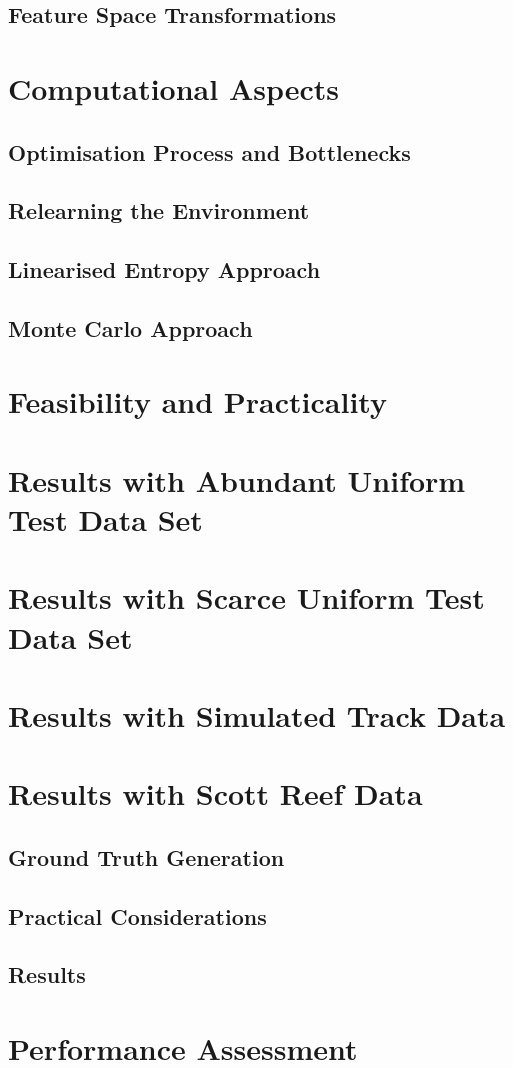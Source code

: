 		\subsection{Feature Space Transformations}
		
	\section{Computational Aspects}
	
		\subsection{Optimisation Process and Bottlenecks}
		
		\subsection{Relearning the Environment}
		
		\subsection{Linearised Entropy Approach}
		
		\subsection{Monte Carlo Approach}
		
	\section{Feasibility and Practicality}
	
	\section{Results with Abundant Uniform Test Data Set}
	
	\section{Results with Scarce Uniform Test Data Set}
	
	\section{Results with Simulated Track Data}
	
	\section{Results with Scott Reef Data}
	
		\subsection{Ground Truth Generation}
		
		\subsection{Practical Considerations}
		
		\subsection{Results}
		
	\section{Performance Assessment}
	
	
	